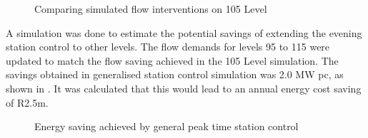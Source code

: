 	\begin{figure}[h!]
		\centering
		
		\caption{Comparing simulated flow interventions on 105 Level}
		\label{fig: Station vs stope}
	\end{figure}
A simulation was done to estimate the potential savings of extending the evening station control to other levels.  The flow demands for levels 95 to 115 were updated to match the flow saving achieved in the 105 Level simulation. The savings obtained in generalised station control simulation was 2.0 MW \gls{pc}, as shown in . It was calculated that this would lead to an annual energy cost saving of R2.5m.
\begin{figure}[h!]
	\centering
	
	\caption{Energy saving achieved by general peak time station control }
	\label{fig: General station optimise}
\end{figure}
